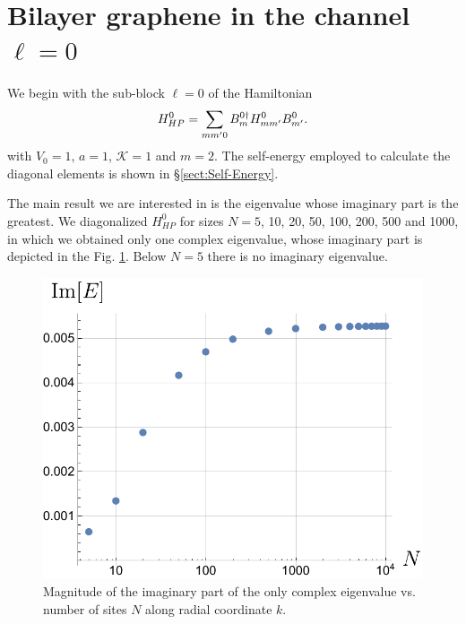 \documentclass[english,aps,prd,nofootinbib,twocolumn]{revtex4-1}
\begin{document}
\section{Bilayer graphene in the channel $\ell=0$}
We begin with the sub-block $\ell = 0$ of the Hamiltonian 
\begin{equation}
H_{HP}^{0} = 
\sum_{mm'0}
B_{m}^{0\textcolor{black}{\dagger}}
H_{mm'}^{0}
B_{m'}^{0}.
\end{equation}
with $V_{0}=1$, $a=1$, $\mathcal{K}=1$ and $m=2$. The self-energy employed to calculate the diagonal elements is shown in \S\ref{sect:Self-Energy}. 

The main result we are interested in is the eigenvalue whose imaginary part is the greatest. We diagonalized $H_{HP}^{0}$ for sizes $N=5$, 10, 20, 50, 100, 200, 500 and 1000, in which we obtained only one complex eigenvalue, whose imaginary part is depicted in the Fig. \ref{fig:MaxImEigVal}. Below $N=5$ there is no imaginary eigenvalue. 

\begin{figure}[h]
\centering
\includegraphics[scale=0.6]{MaxImEigVal.pdf}
\caption{Magnitude of the imaginary part of the only complex eigenvalue vs. number of sites $N$ along radial coordinate $k$.}
\label{fig:MaxImEigVal}
\end{figure}
\end{document}
